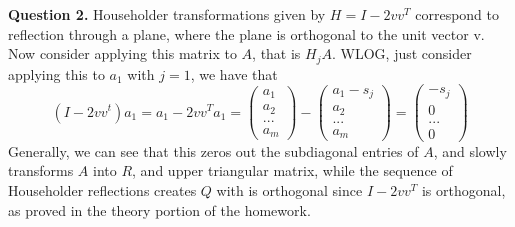 \documentclass{article}
\begin{document}
\textbf{Question 2.} Householder transformations given by $H = I- 2vv^T$ correspond to reflection through a plane, where the plane is orthogonal to the unit vector v. Now consider applying this matrix to $A$, that is $H_j A$. WLOG, just consider applying this to $a_1$ with $j=1$, we have that 
\begin{equation*}
    (I-2vv^t)a_1 = a_1 - 2vv^T a_1 = \begin{pmatrix}
        a_1\\a_2\\...\\a_m
    \end{pmatrix} -
    \begin{pmatrix}
        a_1 - s_j\\
        a_2\\
        ...\\
        a_m
    \end{pmatrix} = \begin{pmatrix}
        -s_j\\
        0\\
        ... \\
        0
    \end{pmatrix}
\end{equation*}
Generally, we can see that this zeros out the subdiagonal entries of $A$, and slowly transforms $A$ into $R$, and upper triangular matrix, while the sequence of Householder reflections creates $Q$ with is orthogonal since $I-2vv^T$ is orthogonal, as proved in the theory portion of the homework. \\
\end{document}
